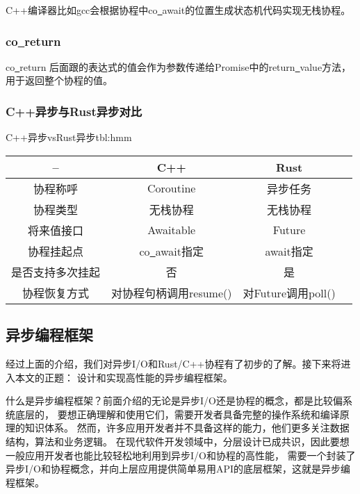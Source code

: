 \documentclass[supercite]{HustGraduPaper}
\theoremstyle{definition}
\begin{document}
C++编译器比如gcc会根据协程中co\underline{~}await的位置生成状态机代码实现无栈协程。\par

\subsubsection{co\underline{~}return}

co\underline{~}return 后面跟的表达式的值会作为参数传递给Promise中的return\underline{~}value方法，
用于返回整个协程的值。\par

\subsubsection{C++异步与Rust异步对比}

\begin{generaltab}{C++异步vsRust异步}{tbl:hmm}
  \begin{tabular}{c|ccc}
    \toprule
    -- & C++ & Rust \\
    \midrule
    协程称呼 & Coroutine & 异步任务 \\
    协程类型 & 无栈协程 & 无栈协程 \\
    将来值接口 & Awaitable & Future \\
    协程挂起点 & co\underline{~}await指定 & await指定 \\
    是否支持多次挂起 & 否 & 是 \\
    协程恢复方式 & 对协程句柄调用resume() & 对Future调用poll() \\
    \bottomrule
  \end{tabular}
\end{generaltab}

\subsection{异步编程框架}

经过上面的介绍，我们对异步I/O和Rust/C++协程有了初步的了解。接下来将进入本文的正题：
设计和实现高性能的异步编程框架。\par

什么是异步编程框架？前面介绍的无论是异步I/O还是协程的概念，都是比较偏系统底层的，
要想正确理解和使用它们，需要开发者具备完整的操作系统和编译原理的知识体系。
然而，许多应用开发者并不具备这样的能力，他们更多关注数据结构，算法和业务逻辑。
在现代软件开发领域中，分层设计已成共识，因此要想一般应用开发者也能比较轻松地利用到异步I/O和协程的高性能，
需要一个封装了异步I/O和协程概念，并向上层应用提供简单易用API的底层框架，这就是异步编程框架。\par
\end{document}
